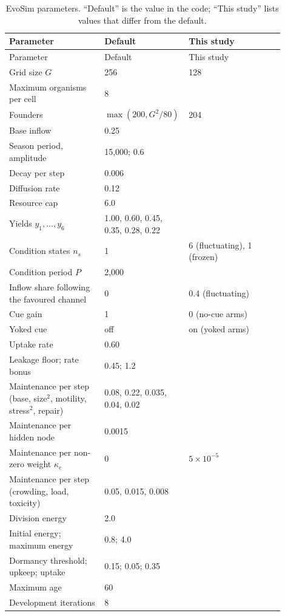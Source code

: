 \begin{longtable}{@{}p{0.34\linewidth}p{0.22\linewidth}p{0.34\linewidth}@{}}
\caption{EvoSim parameters. ``Default'' is the value in the code; ``This study''
lists values that differ from the default.}\label{tab:params}\\
\toprule
Parameter & Default & This study\\
\midrule
\endfirsthead
\toprule
Parameter & Default & This study\\
\midrule
\endhead
Grid size $G$ & 256 & 128\\
Maximum organisms per cell & 8 & \\
Founders & $\max(200, G^2/80)$ & 204\\
Base inflow & 0.25 & \\
Season period, amplitude & 15{,}000; 0.6 & \\
Decay per step & 0.006 & \\
Diffusion rate & 0.12 & \\
Resource cap & 6.0 & \\
Yields $y_1,\dots,y_6$ & 1.00, 0.60, 0.45, 0.35, 0.28, 0.22 & \\
Condition states $n_s$ & 1 & 6 (fluctuating), 1 (frozen)\\
Condition period $P$ & 2{,}000 & \\
Inflow share following the favoured channel & 0 & 0.4 (fluctuating)\\
Cue gain & 1 & 0 (no-cue arms)\\
Yoked cue & off & on (yoked arms)\\
Uptake rate & 0.60 & \\
Leakage floor; rate bonus & 0.45; 1.2 & \\
Maintenance per step (base, size$^2$, motility, stress$^2$, repair) & 0.08, 0.22, 0.035, 0.04, 0.02 & \\
Maintenance per hidden node & 0.0015 & \\
Maintenance per non-zero weight $\kappa_e$ & 0 & $5\times10^{-5}$\\
Maintenance per step (crowding, load, toxicity) & 0.05, 0.015, 0.008 & \\
Division energy & 2.0 & \\
Initial energy; maximum energy & 0.8; 4.0 & \\
Dormancy threshold; upkeep; uptake & 0.15; 0.05; 0.35 & \\
Maximum age & 60 & \\
Development iterations & 8 & \\

\end{longtable}
